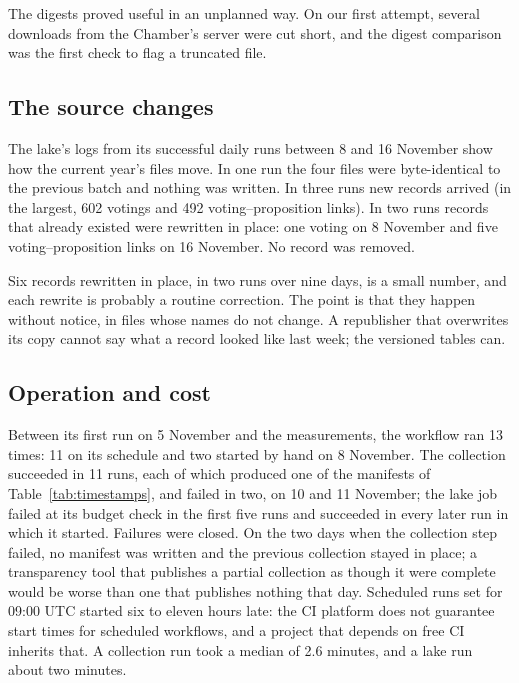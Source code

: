 The digests proved useful in an unplanned way. On our first attempt, several downloads from the Chamber's server were cut short, and the digest comparison was the first check to flag a truncated file.

\subsection{The source changes}
\label{sec:eval-drift}

The lake's logs from its successful daily runs between 8 and 16 November show how the current year's files move. In one run the four files were byte-identical to the previous batch and nothing was written. In three runs new records arrived (in the largest, 602 votings and 492 voting--proposition links). In two runs records that already existed were rewritten in place: one voting on 8 November and five voting--proposition links on 16 November. No record was removed.

Six records rewritten in place, in two runs over nine days, is a small number, and each rewrite is probably a routine correction. The point is that they happen without notice, in files whose names do not change. A republisher that overwrites its copy cannot say what a record looked like last week; the versioned tables can.

\subsection{Operation and cost}
\label{sec:eval-ops}

Between its first run on 5 November and the measurements, the workflow ran 13 times: 11 on its schedule and two started by hand on 8 November. The collection succeeded in 11 runs, each of which produced one of the manifests of Table~\ref{tab:timestamps}, and failed in two, on 10 and 11 November; the lake job failed at its budget check in the first five runs and succeeded in every later run in which it started. Failures were closed. On the two days when the collection step failed, no manifest was written and the previous collection stayed in place; a transparency tool that publishes a partial collection as though it were complete would be worse than one that publishes nothing that day. Scheduled runs set for 09:00 UTC started six to eleven hours late: the CI platform does not guarantee start times for scheduled workflows, and a project that depends on free CI inherits that. A collection run took a median of 2.6 minutes, and a lake run about two minutes.

